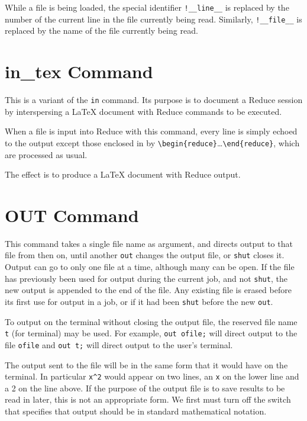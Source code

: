 While a file is being loaded, the special identifier
\texttt{!\_\_line\_\_}
is replaced by the number of the current line in the file currently
being read.
Similarly, \texttt{!\_\_file\_\_}
is replaced by the name of the file currently
being read.

\section{in\_tex Command}
\hypertarget{command:IN_TEX}{}

This is a variant of the \texttt{in} command. Its purpose is to document a Reduce session
by interspersing a \LaTeX{} document with Reduce commands to be executed.

When a file is input into Reduce with this command, every line is simply echoed to the output
except those enclosed in by \verb+\begin{reduce}+\ldots\verb+\end{reduce}+,
which are processed as usual.

The effect is to produce a \LaTeX{} document with Reduce output.


\section{OUT Command}
\hypertarget{command:OUT}{}
This command takes a single file name as argument, and directs output to
that file from then on, until another \texttt{out} changes the output file,
or \texttt{shut} closes it.  Output can go to only one file at a time,
although many can be open.  If the file has previously been used for
output during the current job, and not \texttt{shut}, the new
output is appended to the end of the file.  Any existing file is erased
before its first use for output in a job, or if it had been \texttt{shut}
before the new \texttt{out}.

To output on the terminal without closing the output file, the reserved
file name \texttt{t} (for terminal) may be used.  For example,
\texttt{out ofile;} will direct output to the file \texttt{ofile} and
\texttt{out t;} will direct output to the user's terminal.

The output sent to the file will be in the same form that it would have on
the terminal.  In particular \texttt{x\textasciicircum 2} would appear 
on two lines, an
\texttt{x} on the lower line and a 2 on the line above.  If the purpose of the
output file is to save results to be read in later, this is not an
appropriate form.  We first must turn off the  switch that
specifies that output should be in standard mathematical notation.

